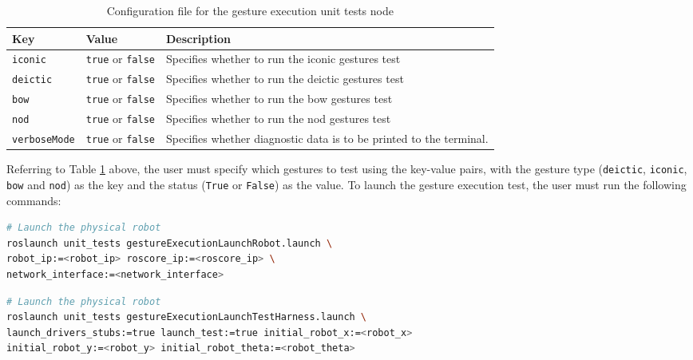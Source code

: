 \documentclass{CSSRforAfrica}
\begin{document}
\begin{longtable}[c]{|l|l|p{7cm}|}
    \caption{Configuration file for the gesture execution unit tests node} \label{tab:unit_tests_config_file}\\
    \hline
    \rowcolor{gray!30}
    \small{\textbf{Key}} & \small{\textbf{Value}} & \small{\textbf{Description}} \\ \hline
    \endhead %

    
\small{\texttt{iconic}} & \small{\texttt{true}} or \texttt{false} & \small{Specifies whether to run the iconic gestures test} \\ \hline

\small{\texttt{deictic}} & \small{\texttt{true}} or \texttt{false} & \small{Specifies whether to run the deictic gestures test} \\ \hline
 
\small{\texttt{bow}} & \small{\texttt{true}} or \texttt{false} & \small{Specifies whether to run the bow gestures test} \\ \hline
    
\small{\texttt{nod}} & \small{\texttt{true}} or \texttt{false} & \small{Specifies whether to run the nod gestures test} \\ \hline
    
 \small{\texttt{verboseMode}} & \small{\texttt{true}} or \texttt{false} & \small{Specifies whether diagnostic data is to be printed to the terminal.} \\ \hline


\end{longtable}


Referring to Table \ref{tab:unit_tests_config_file} above, the user must specify which gestures to test using the key-value pairs, with the gesture type (\texttt{deictic}, \texttt{iconic}, \texttt{bow} and \texttt{nod}) as the key and the status (\texttt{True} or \texttt{False}) as the value. To launch the gesture execution test, the user must run the following commands:

\begin{lstlisting}[style=withoutNumbering, language=bash]
# Launch the physical robot
roslaunch unit_tests gestureExecutionLaunchRobot.launch \
robot_ip:=<robot_ip> roscore_ip:=<roscore_ip> \
network_interface:=<network_interface>
\end{lstlisting}


\begin{lstlisting}[style=withoutNumbering, language=bash]
# Launch the physical robot
roslaunch unit_tests gestureExecutionLaunchTestHarness.launch \
launch_drivers_stubs:=true launch_test:=true initial_robot_x:=<robot_x>
initial_robot_y:=<robot_y> initial_robot_theta:=<robot_theta>
\end{lstlisting}
\end{document}
